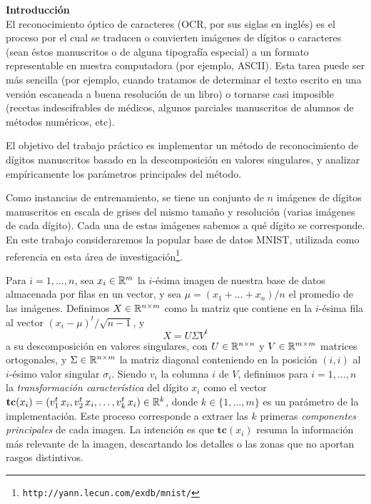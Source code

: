 {\bf Introducci\'on}\\

El reconocimiento \'optico de caracteres (OCR, por sus siglas en ingl\'es) es el proceso por el cual se traducen o convierten im\'agenes de d\'igitos o caracteres (sean \'estos manuscritos o de alguna tipograf\'ia especial) a un formato representable en nuestra computadora (por ejemplo, ASCII). Esta tarea puede ser m\'as sencilla (por ejemplo, cuando tratamos de determinar el texto escrito en una versi\'on escaneada a buena resoluci\'on de un libro) o tornarse casi imposible (recetas indescifrables de m\'edicos, algunos parciales manuscritos de alumnos de m\'etodos num\'ericos, etc).

El objetivo del trabajo pr\'actico es implementar un m\'etodo de reconocimiento de d\'igitos manuscritos basado en la descomposici\'on en valores singulares, y analizar emp\'iricamente los par\'ametros principales del m\'etodo.

Como instancias de entrenamiento, se tiene un conjunto de $n$ im\'agenes de d\'igitos ma\-nus\-cri\-tos en escala de grises del mismo tama\~no y resoluci\'on (varias im\'agenes de cada d\'igito). Cada una de estas im\'agenes sabemos a qu\'e d\'igito se corresponde.
En este trabajo consideraremos la popular base de datos MNIST, utilizada como referencia en esta \'area de investigaci\'on\footnote{\texttt{http://yann.lecun.com/exdb/mnist/}}. 

Para $i = 1,\ldots, n$, sea $x_i \in \mathbb{R}^{m}$ la $i$-\'esima imagen de nuestra base de datos almacenada por filas en un vector, y sea $\mu = (x_1 + \ldots + x_n)/n$ el promedio de las im\'agenes. Definimos $X\in\mathbb{R}^{n\times m}$ como la matriz que contiene en la $i$-\'esima fila al vector $(x_i - \mu)^{t}/\sqrt{n-1}$, y $$X=U \Sigma V^t$$ a su descomposici\'on en valores singulares, con $U\in\mathbb{R}^{n\times n}$ y $V\in\mathbb{R}^{m\times m}$ matrices ortogonales, y $\Sigma\in\mathbb{R}^{n\times m}$ la matriz diagonal conteniendo en la posici\'on $(i,i)$ al $i$-\'esimo valor singular $\sigma_i$.
Siendo $v_i$ la columna $i$ de $V$, definimos para $i = 1,\ldots,n$ la \textsl{transformaci\'on caracter\'istica} del d\'igito $x_{i}$ como el vector $\mathbf{tc}(x_i) = (v_1^t\, x_i, v_2^t\, x_i,\ldots,v_k^t\, x_i) \in\mathbb{R}^k$, donde $k \in\{1,\ldots,m\}$ es un par\'ametro de la implementaci\'on. Este proceso corresponde a extraer las $k$ primeras \textit{componentes principales} de cada imagen. La intenci\'on es que $\mathbf{tc}(x_i)$ resuma la informaci\'on m\'as relevante de la imagen, descartando los detalles o las zonas que no aportan rasgos distintivos.

